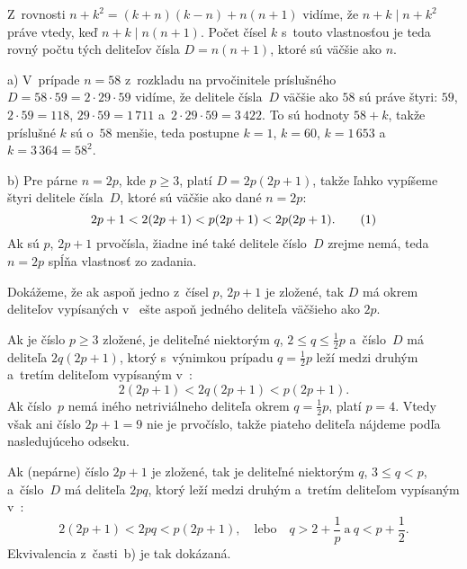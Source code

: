 {%
Z~rovnosti $n+k^2=(k+n)(k-n)+n(n+1)$ vidíme, že $n+k\mid n+k^2$ práve vtedy, keď $n+k\mid n(n+1)$. Počet čísel $k$ s~touto vlastnosťou je teda rovný počtu tých deliteľov čísla $D=n(n+1)$, ktoré sú väčšie ako $n$.

\smallskip
a) V~prípade $n=58$ z~rozkladu na prvočinitele príslušného $D=58\cdot59=2\cdot29\cdot59$ vidíme, že delitele
čísla~$D$ väčšie ako $58$ sú práve štyri: $59$, $2\cdot59=118$, $29\cdot59=1\,711$ a~$2\cdot29\cdot59=3\,422$. To sú hodnoty $58+k$, takže príslušné $k$ sú o~$58$ menšie, teda postupne $k=1$, $k=60$, $k=1\,653$ a~$k=3\,364=58^2$.

\smallskip
b) Pre párne $n=2p$, kde $p\ge3$, platí $D=2p(2p+1)$, takže ľahko vypíšeme štyri delitele čísla~$D$, ktoré sú väčšie ako dané $n=2p$:
$$
2p+1<2(2p+1)<p(2p+1)<2p(2p+1).
\tag1
$$
Ak sú $p$, $2p+1$ prvočísla, žiadne iné také delitele číslo~$D$ zrejme nemá, teda $n=2p$ spĺňa vlastnosť zo zadania.

Dokážeme, že ak aspoň jedno z~čísel $p$, $2p+1$ je zložené, tak $D$ má okrem deliteľov vypísaných v~ ešte aspoň jedného deliteľa väčšieho ako $2p$.

Ak je číslo $p\ge3$ zložené, je deliteľné niektorým $q$, $2\le q\le\frac12p$ a~číslo~$D$ má deliteľa $2q(2p+1)$, ktorý s~výnimkou prípadu $q=\frac12p$ leží medzi druhým a~tretím deliteľom vypísaným v~:
$$
2(2p+1)<2q(2p+1)<p(2p+1).
$$
Ak číslo~$p$ nemá iného netriviálneho deliteľa okrem $q=\frac12p$, platí $p=4$. Vtedy však ani číslo $2p+1=9$ nie je prvočíslo, takže piateho deliteľa nájdeme podľa nasledujúceho odseku.

Ak (nepárne) číslo $2p+1$ je zložené, tak je deliteľné niektorým $q$, $3\le q<p$, a~číslo~$D$ má deliteľa $2pq$, ktorý leží medzi druhým a~tretím deliteľom vypísaným v~:
$$
2(2p+1)<2pq<p(2p+1),\quad\text{lebo}\quad
q>2+\frac{1}{p}\ \text{a}\
q<p+\frac{1}{2}.
$$
Ekvivalencia z~časti~b) je tak dokázaná.
}

